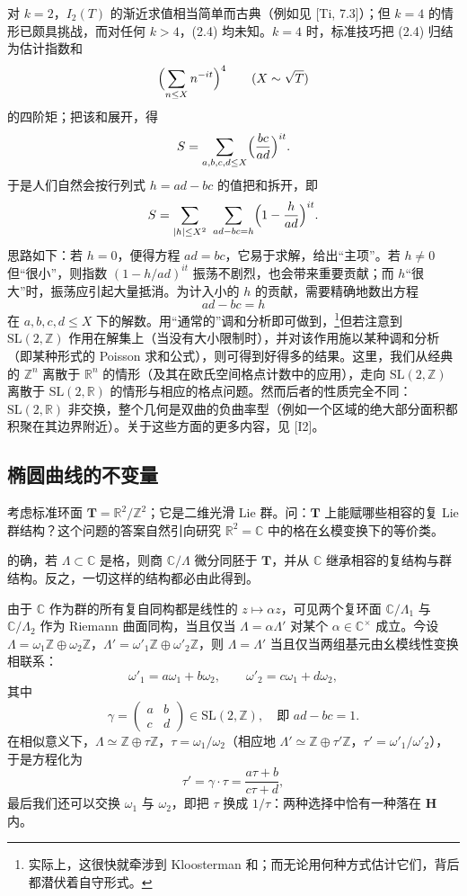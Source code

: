 对 $k=2$，$I_{2}(T)$ 的渐近求值相当简单而古典（例如见 [Ti, 7.3]）；但 $k=4$ 的情形已颇具挑战，而对任何 $k>4$，(2.4) 均未知。$k=4$ 时，标准技巧把 (2.4) 归结为估计指数和
\[
\Bigl(\sum_{n\le X}n^{-it}\Bigr)^{4}\qquad(X\sim\sqrt{T})
\]
的四阶矩；把该和展开，得
\[
S=\sum_{a,b,c,d\le X}\Bigl(\frac{bc}{ad}\Bigr)^{it}.
\]
于是人们自然会按行列式 $h=ad-bc$ 的值把和拆开，即
\[
S=\sum_{|h|\le X^{2}}\ \sum_{ad-bc=h}\Bigl(1-\frac{h}{ad}\Bigr)^{it}.
\]
思路如下：若 $h=0$，便得方程 $ad=bc$，它易于求解，给出“主项”。若 $h\ne0$ 但“很小”，则指数 $(1-h/ad)^{it}$ 振荡不剧烈，也会带来重要贡献；而 $h$“很大”时，振荡应引起大量抵消。为计入小的 $h$ 的贡献，需要精确地数出方程
\[
ad-bc=h
\]
在 $a,b,c,d\le X$ 下的解数。用“通常的”调和分析即可做到，\footnote{实际上，这很快就牵涉到 Kloosterman 和；而无论用何种方式估计它们，背后都潜伏着自守形式。}但若注意到 $\mathrm{SL}(2,\mathbb{Z})$ 作用在解集上（当没有大小限制时），并对该作用施以某种调和分析（即某种形式的 Poisson 求和公式），则可得到好得多的结果。这里，我们从经典的 $\mathbb{Z}^{n}$ 离散于 $\mathbb{R}^{n}$ 的情形（及其在欧氏空间格点计数中的应用），走向 $\mathrm{SL}(2,\mathbb{Z})$ 离散于 $\mathrm{SL}(2,\mathbb{R})$ 的情形与相应的格点问题。然而后者的性质完全不同：$\mathrm{SL}(2,\mathbb{R})$ 非交换，整个几何是双曲的负曲率型（例如一个区域的绝大部分面积都积聚在其边界附近）。关于这些方面的更多内容，见 [I2]。

\subsection{椭圆曲线的不变量}\label{c3:sec:2.3}

考虑标准环面 $\mathbf{T}=\mathbb{R}^{2}/\mathbb{Z}^{2}$；它是二维光滑 Lie 群。问：$\mathbf{T}$ 上能赋哪些相容的复 Lie 群结构？这个问题的答案自然引向研究 $\mathbb{R}^{2}=\mathbb{C}$ 中的格在幺模变换下的等价类。

的确，若 $\Lambda\subset\mathbb{C}$ 是格，则商 $\mathbb{C}/\Lambda$ 微分同胚于 $\mathbf{T}$，并从 $\mathbb{C}$ 继承相容的复结构与群结构。反之，一切这样的结构都必由此得到。

由于 $\mathbb{C}$ 作为群的所有复自同构都是线性的 $z\mapsto\alpha z$，可见两个复环面 $\mathbb{C}/\Lambda_{1}$ 与 $\mathbb{C}/\Lambda_{2}$ 作为 Riemann 曲面同构，当且仅当 $\Lambda=\alpha\Lambda'$ 对某个 $\alpha\in\mathbb{C}^{\times}$ 成立。今设 $\Lambda=\omega_{1}\mathbb{Z}\oplus\omega_{2}\mathbb{Z}$，$\Lambda'=\omega'_{1}\mathbb{Z}\oplus\omega'_{2}\mathbb{Z}$，则 $\Lambda=\Lambda'$ 当且仅当两组基元由幺模线性变换相联系：
\[
\omega'_{1}=a\omega_{1}+b\omega_{2},\qquad
\omega'_{2}=c\omega_{1}+d\omega_{2},
\]
其中
\[
\gamma=\begin{pmatrix}a&b\\c&d\end{pmatrix}\in\mathrm{SL}(2,\mathbb{Z}),\quad\text{即 }ad-bc=1.
\]
在相似意义下，$\Lambda\simeq\mathbb{Z}\oplus\tau\mathbb{Z}$，$\tau=\omega_{1}/\omega_{2}$（相应地 $\Lambda'\simeq\mathbb{Z}\oplus\tau'\mathbb{Z}$，$\tau'=\omega'_{1}/\omega'_{2}$），于是方程化为
\[
\tau'=\gamma\cdot\tau=\frac{a\tau+b}{c\tau+d},
\]
最后我们还可以交换 $\omega_{1}$ 与 $\omega_{2}$，即把 $\tau$ 换成 $1/\tau$：两种选择中恰有一种落在 $\mathbf{H}$ 内。

